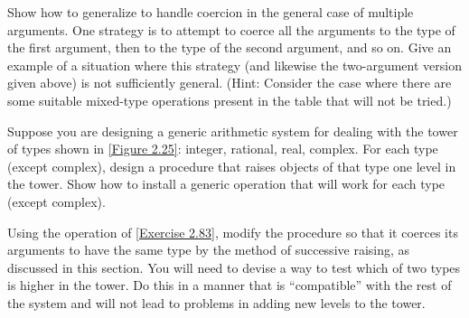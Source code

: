 \begin{exercise}
	\label{Exercise 2.82}
	Show how to generalize  to handle coercion in the general case of multiple arguments.
	One strategy is to attempt to coerce all the arguments to the type of the first argument, then to the type of the second argument, and so on.
	Give an example of a situation where this strategy (and likewise the two-argument version given above) is not sufficiently general.
	(Hint:
	Consider the case where there are some suitable mixed-type operations present in the table that will not be tried.)
\end{exercise}



\begin{exercise}
	\label{Exercise 2.83}
	Suppose you are designing a generic arithmetic system for dealing with the tower of types shown in \cref{Figure 2.25}:
	integer, rational, real, complex.
	For each type (except complex), design a procedure that raises objects of that type one level in the tower.
	Show how to install a generic  operation that will work for each type (except complex).
\end{exercise}



\begin{exercise}
	\label{Exercise 2.84}
	Using the  operation of \cref{Exercise 2.83}, modify the  procedure so that it coerces its arguments to have the same type by the method of successive raising, as discussed in this section.
	You will need to devise a way to test which of two types is higher in the tower.
	Do this in a manner that is “compatible” with the rest of the system and will not lead to problems in adding new levels to the tower.
\end{exercise}



